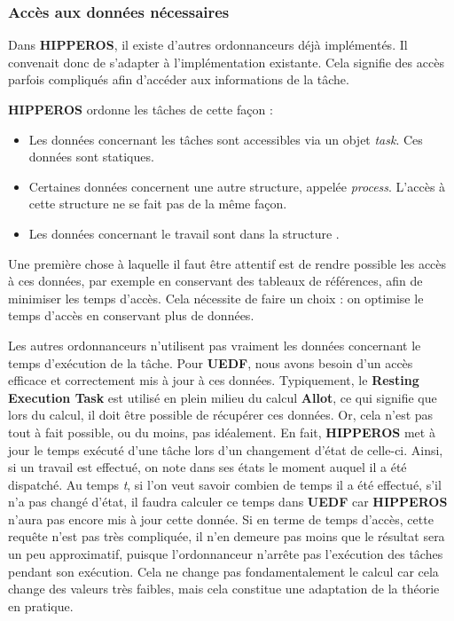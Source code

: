 	\subsubsection{Accès aux données nécessaires}
	
		Dans \textbf{HIPPEROS}, il existe d'autres ordonnanceurs déjà implémentés. Il convenait donc 
		de s'adapter à l'implémentation existante. Cela signifie des accès parfois compliqués afin d'accéder 
		aux informations de la tâche.\newline
		
		\textbf{HIPPEROS} ordonne les tâches de cette façon : 
		\begin{itemize}
			\item Les données concernant les tâches sont accessibles via un objet \textit{task}. Ces 
			données sont statiques.
			\item Certaines données concernent une autre structure, appelée \textit{process}. L'accès 
			à cette structure ne se fait pas de la même façon. 
			\item Les données concernant le travail sont dans la structure .
		\end{itemize}
		Une première chose à laquelle il faut être attentif est de rendre possible les accès 
		à ces données, par exemple en conservant des tableaux de références, afin de minimiser les temps 
		d'accès. Cela nécessite de faire un choix : on optimise le temps d'accès en conservant plus de données. \newline
	
		Les autres ordonnanceurs n'utilisent pas vraiment les données concernant le temps 
		d'exécution de la tâche. Pour \textbf{UEDF}, nous avons besoin d'un accès efficace et 
		correctement mis à jour à ces données. Typiquement, le \textbf{Resting Execution Task} est utilisé en plein 
		milieu du calcul \textbf{Allot}, ce qui signifie que lors du calcul, il doit être possible 
		de récupérer ces données. Or, cela n'est pas tout à fait possible, ou du moins, pas idéalement. 
		En fait, \textbf{HIPPEROS} met à jour le temps exécuté d'une tâche lors d'un changement d'état de celle-ci. 
		Ainsi, si un travail est effectué, on note dans ses états le moment auquel il a été dispatché.
		Au temps \textit{t}, si l'on veut savoir combien de temps il a été effectué, s'il n'a pas changé 
		d'état, il faudra calculer ce temps dans \textbf{UEDF} car \textbf{HIPPEROS} n'aura pas encore mis à 
		jour cette donnée.\newline
		Si en terme de temps d'accès, cette requête n'est pas très compliquée, il n'en demeure pas moins 
		que le résultat sera un peu approximatif, puisque l'ordonnanceur n'arrête pas l'exécution des tâches pendant 
		son exécution. Cela ne change pas fondamentalement le calcul car cela change des valeurs très faibles, 
		mais cela constitue une adaptation de la théorie en pratique.\newline
		
